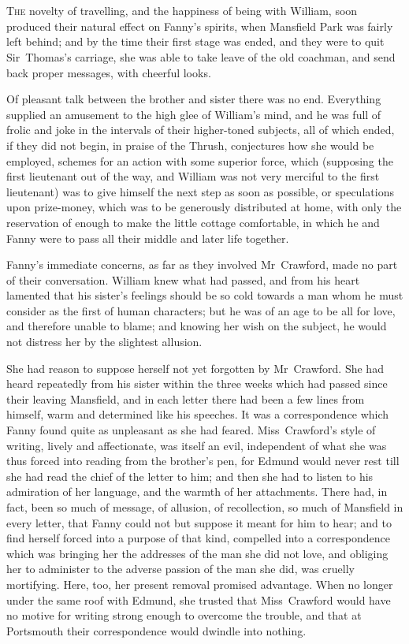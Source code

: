 \chapter[Chapter \thechapter]{} 

 \lettrine[lraise=0.3]{T}{he} novelty of travelling, and the happiness of being with William, soon produced their natural effect on Fanny's spirits, when Mansfield Park was fairly left behind; and by the time their first stage was ended, and they were to quit Sir~Thomas's carriage, she was able to take leave of the old coachman, and send back proper messages, with cheerful looks.

Of pleasant talk between the brother and sister there was no end. Everything supplied an amusement to the high glee of William's mind, and he was full of frolic and joke in the intervals of their higher-toned subjects, all of which ended, if they did not begin, in praise of the Thrush, conjectures how she would be employed, schemes for an action with some superior force, which (supposing the first lieutenant out of the way, and William was not very merciful to the first lieutenant) was to give himself the next step as soon as possible, or speculations upon prize-money, which was to be generously distributed at home, with only the reservation of enough to make the little cottage comfortable, in which he and Fanny were to pass all their middle and later life together.

Fanny's immediate concerns, as far as they involved Mr~Crawford, made no part of their conversation. William knew what had passed, and from his heart lamented that his sister's feelings should be so cold towards a man whom he must consider as the first of human characters; but he was of an age to be all for love, and therefore unable to blame; and knowing her wish on the subject, he would not distress her by the slightest allusion.

She had reason to suppose herself not yet forgotten by Mr~Crawford. She had heard repeatedly from his sister within the three weeks which had passed since their leaving Mansfield, and in each letter there had been a few lines from himself, warm and determined like his speeches. It was a correspondence which Fanny found quite as unpleasant as she had feared. Miss~Crawford's style of writing, lively and affectionate, was itself an evil, independent of what she was thus forced into reading from the brother's pen, for Edmund would never rest till she had read the chief of the letter to him; and then she had to listen to his admiration of her language, and the warmth of her attachments. There had, in fact, been so much of message, of allusion, of recollection, so much of Mansfield in every letter, that Fanny could not but suppose it meant for him to hear; and to find herself forced into a purpose of that kind, compelled into a correspondence which was bringing her the addresses of the man she did not love, and obliging her to administer to the adverse passion of the man she did, was cruelly mortifying. Here, too, her present removal promised advantage. When no longer under the same roof with Edmund, she trusted that Miss~Crawford would have no motive for writing strong enough to overcome the trouble, and that at Portsmouth their correspondence would dwindle into nothing.

